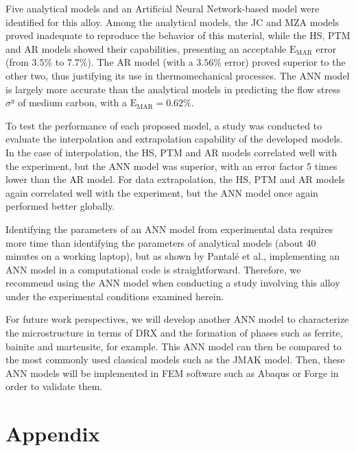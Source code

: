 \documentclass[twoside,english,1p,final,sort&compress]{elsarticle}
\makeatletter
\theoremstyle{plain}
\DeclareRobustCommand{\eal}{et al.\@\xspace}
\DeclareRobustCommand{\MARE}{\text{E}_\text{MAR}}
\makeatother
\begin{document}
Five analytical models and an Artificial Neural Network-based model were identified for this alloy.
Among the analytical models, the JC and MZA models proved inadequate to reproduce the behavior of this material, while the HS, PTM and AR models showed their capabilities, presenting an acceptable $\MARE$ error (from $3.5\%$ to $7.7\%$).
The AR model (with a $3.56\%$ error) proved superior to the other two, thus justifying its use in thermomechanical processes.
The ANN model is largely more accurate than the analytical models in predicting the flow stress $\sigma^y$ of medium carbon, with a $\MARE=0.62\%$.

To test the performance of each proposed model, a study was conducted to evaluate the interpolation and extrapolation capability of the developed models.
In the case of interpolation, the HS, PTM and AR models correlated well with the experiment, but the ANN model was superior, with an error factor 5 times lower than the AR model.
For data extrapolation, the HS, PTM and AR models again correlated well with the experiment, but the ANN model once again performed better globally.

Identifying the parameters of an ANN model from experimental data requires more time than identifying the parameters of analytical models (about 40 minutes on a working laptop), but as shown by Pantalé \eal \cite{Pantale-2021, Pantale-2023}, implementing an ANN model in a computational code is straightforward.
Therefore, we recommend using the ANN model when conducting a study involving this alloy under the experimental conditions examined herein.

For future work perspectives, we will develop another ANN model to characterize the microstructure in terms of DRX and the formation of phases such as ferrite, bainite and martensite, for example.
This ANN model can then be compared to the most commonly used classical models such as the JMAK model.
Then, these ANN models will be implemented in FEM software such as Abaqus or Forge in order to validate them.




\section*{Appendix\label{sec:Appendix}}
\end{document}
